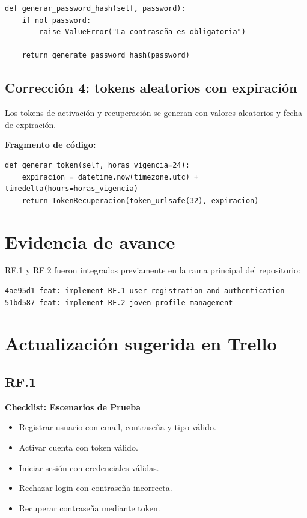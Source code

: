 \documentclass[12pt,a4paper]{article}
\begin{document}
\begin{lstlisting}[style=pythonstyle]
def generar_password_hash(self, password):
    if not password:
        raise ValueError("La contraseña es obligatoria")

    return generate_password_hash(password)
\end{lstlisting}

\subsection{Corrección 4: tokens aleatorios con expiración}

Los tokens de activación y recuperación se generan con valores aleatorios y fecha de expiración.

\textbf{Fragmento de código:}

\begin{lstlisting}[style=pythonstyle]
def generar_token(self, horas_vigencia=24):
    expiracion = datetime.now(timezone.utc) + timedelta(hours=horas_vigencia)
    return TokenRecuperacion(token_urlsafe(32), expiracion)
\end{lstlisting}

\section{Evidencia de avance}

RF.1 y RF.2 fueron integrados previamente en la rama principal del repositorio:

\begin{lstlisting}[style=textstyle]
4ae95d1 feat: implement RF.1 user registration and authentication
51bd587 feat: implement RF.2 joven profile management
\end{lstlisting}

\section{Actualización sugerida en Trello}

\subsection{RF.1}

\textbf{Checklist: Escenarios de Prueba}

\begin{itemize}
    \item Registrar usuario con email, contraseña y tipo válido.
    \item Activar cuenta con token válido.
    \item Iniciar sesión con credenciales válidas.
    \item Rechazar login con contraseña incorrecta.
    \item Recuperar contraseña mediante token.
\end{itemize}
\end{document}
